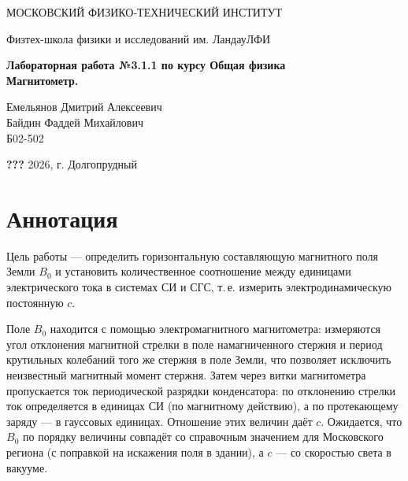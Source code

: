 \documentclass[a4paper,12pt]{article}
\newcommand{\qq}{\textbf{???}}
\begin{document}
\begin{titlepage}
\begin{center}
    {\large МОСКОВСКИЙ ФИЗИКО-ТЕХНИЧЕСКИЙ ИНСТИТУТ}
\end{center}
\begin{center}
    {\large Физтех-школа физики и исследований им. Ландау\break ЛФИ}
\end{center}

    \vspace{3cm}

\vspace{0.15cm}
{
\begin{center}
    \huge \bf Лабораторная работа №3.1.1 по курсу Общая физика\\
    \vspace{0.4cm}
    \LARGE Магнитометр.
\end{center}
}
\vspace{1.5cm}
\begin{flushright}
Емельянов Дмитрий Алексеевич\\
Байдин Фаддей Михайлович\\
\vspace{0.4cm}
Б02-502
\end{flushright}
\vspace{10cm}
\begin{center}
    \large \qq{} 2026, г. Долгопрудный
\end{center}
\end{titlepage}

\section{Аннотация}
Цель работы --- определить горизонтальную составляющую магнитного поля Земли
$B_0$ и установить количественное соотношение между единицами
электрического тока в системах СИ и СГС, т.\,е. измерить
электродинамическую постоянную $c$.

Поле $B_0$ находится с помощью электромагнитного магнитометра: измеряются
угол отклонения магнитной стрелки в поле намагниченного стержня и период
крутильных колебаний того же стержня в поле Земли, что позволяет исключить
неизвестный магнитный момент стержня. Затем через витки магнитометра
пропускается ток периодической разрядки конденсатора: по отклонению стрелки
ток определяется в единицах СИ (по магнитному действию), а по
протекающему заряду --- в гауссовых единицах. Отношение этих величин даёт
$c$. Ожидается, что $B_0$ по порядку величины совпадёт со справочным
значением для Московского региона (с поправкой на искажения поля в здании),
а $c$ --- со скоростью света в вакууме.
\end{document}

